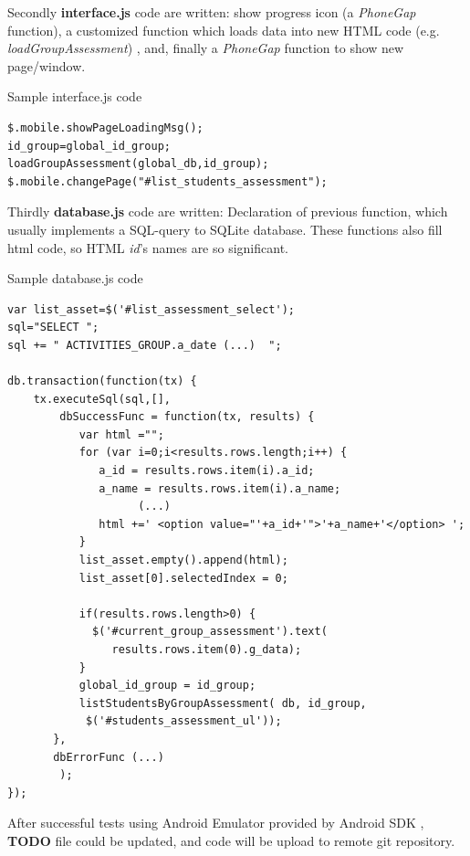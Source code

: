 	   
    Secondly { \bf interface.js} code are written: show progress icon (a \emph{PhoneGap} function), a customized function which loads data into new HTML code (e.g. \emph{loadGroupAssessment}) , 
    and, finally a \emph{PhoneGap} function to  show new page/window.
\begin{bclogo}[couleur=blue!30,arrondi=0.1,ombre=true ] 
{Sample interface.js code}        
        \begin{verbatim}
$.mobile.showPageLoadingMsg();
id_group=global_id_group; 
loadGroupAssessment(global_db,id_group);
$.mobile.changePage("#list_students_assessment");
    \end{verbatim}  
\end{bclogo}

    Thirdly {\bf database.js} code are written: Declaration of previous function, which  usually implements a SQL-query to SQLite database. These functions also fill html code, so HTML \emph{id}'s names are so significant.
    
\begin{bclogo}[couleur=blue!30,arrondi=0.1,ombre=true ] 
{Sample database.js code}    
\begin{verbatim}
var list_asset=$('#list_assessment_select'); 
sql="SELECT ";
sql += " ACTIVITIES_GROUP.a_date (...)  ";

db.transaction(function(tx) {
    tx.executeSql(sql,[],
        dbSuccessFunc = function(tx, results) {
           var html ="";
           for (var i=0;i<results.rows.length;i++) {
              a_id = results.rows.item(i).a_id;
              a_name = results.rows.item(i).a_name;
                    (...)
              html +=' <option value="'+a_id+'">'+a_name+'</option> ';
           }
           list_asset.empty().append(html);
           list_asset[0].selectedIndex = 0; 

           if(results.rows.length>0) {
             $('#current_group_assessment').text(
                results.rows.item(0).g_data); 
           }
           global_id_group = id_group;
           listStudentsByGroupAssessment( db, id_group, 
            $('#students_assessment_ul'));
       },
       dbErrorFunc (...)
        ); 
});
\end{verbatim}    
\end{bclogo}    
    
    After successful tests using Android Emulator provided by Android SDK \cite{AndroidDevelopmentKit}, {\bf TODO} file could be updated, and code will be upload to remote git \cite{EduXes} repository.
  
